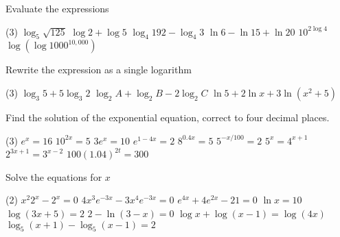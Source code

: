 \begin{Exercise}[title={Logarithmic Functions},label=exLogFunctions]
\Question Evaluate the expressions 
\begin{tasks} (3)
	\task $\log _{5} \sqrt{125}$	%
	\task $\log  2 +\log  5$		%
	\task $\log _{4} 192 -\log _{4} 3$	%
	\task $\ln  6 -\ln  15 +\ln  20$	%
	\task $10^{2 \log  4}$ 			%
	\task $\log  \left (\log  1000^{10,000}\right )$	%
	\end{tasks}
	
	\Question Rewrite the expression as a single logarithm
	\begin{tasks}(3)
		\task $\log _{3} 5 +5 \log _{3} 2$	%
		\task $\log _{2} A +\log _{2} B -2 \log _{2} C$%
		\task $\ln  5 +2 \ln  x +3 \ln  \left (x^{2} +5\right )$ %
		\end{tasks}
	
	\Question Find the solution of the exponential equation, correct to four decimal places. 
	\begin{tasks}(3)
		\task $e^{x} =16$ 		%
		\task $10^{2 x} =5$ 	%
		\task $3 e^{x} =10$ 	%
		\task $e^{1 -4 x} =2$ 	%
		\task $8^{0.4 x} =5$ 	%
		\task $5^{ -x/100} =2$	%
		\task $5^{x} =4^{x +1}$ %
		\task $2^{3 x +1} =3^{x -2}$ 	%
		\task $100 \left (1.04\right )^{2 t} =300$	%
		\end{tasks}
	
		\Question Solve the equations for $x$ 
	\begin{tasks}(2)
		\task $x^{2} 2^{x} -2^{x} =0$ %
		\task $4 x^{3} e^{ -3 x} -3 x^{4} e^{ -3 x} =0$%
		\task $e^{4 x} +4 e^{2 x} -21 =0$ %
		\task $\ln  x =10$ %
		\task $\log  \left (3 x +5\right ) =2$%
		\task $2 -\ln  \left (3 -x\right ) =0$%
		\task $\log  x +\log  \left (x -1\right ) =\log  \left (4 x\right )$ %
		\task $\log _{5} \left (x +1\right ) -\log _{5} \left (x -1\right ) =2$ %
\end{tasks}	
\end{Exercise}	
